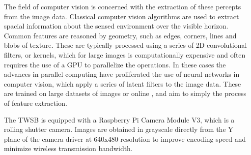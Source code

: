         The field of computer vision is concerned with the extraction of these percepts from the image data. 
        Classical computer vision algorithms are used to extract spacial information about the sensed environment over the visible 
        horizon. Common features are reasoned by geometry, \cite{lee2009geometric} such as edges, corners, lines and blobs of texture. 
        These are typically processed using a series of 2D convolutional filters, or kernels, which for large images is
        computationally expensive and often requires the use of a GPU to parallelize the operations. In these cases the
        advances in parallel computing have proliferated the use of neural networks in computer vision, which apply a 
        series of latent filters to the image data. These are trained on large datasets of images 
        or online \cite{tai2017virtual} \cite{lee2013line} \cite{kober2013reinforcement}, and aim to simply the process of feature extraction. 
        
        The TWSB is equipped with a Raspberry Pi Camera Module V3, which is a rolling shutter camera. Images are obtained 
        in grayscale directly from the Y plane of the camera driver at 640x480 resolution to improve encoding speed and 
        minimize wireless transmission bandwidth.

